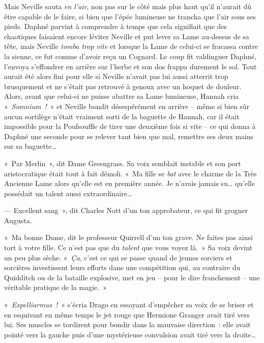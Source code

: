 Mais Neville sauta \emph{en l'air}, non pas sur le côté mais plus haut qu'il n'aurait dû être capable de le faire, si bien que l'épée lumineuse ne trancha que l'air sous ses pieds. Daphné parvint à comprendre à temps que cela signifiait que des chaotiques faisaient encore léviter Neville et put lever sa Lame au-dessus de sa tête, mais Neville \emph{tomba trop vite} et lorsque la Lame de celui-ci se fracassa contre la sienne, ce fut comme d'avoir reçu un Cognard. Le coup fit valdinguer Daphné, l'envoya s'effondrer en arrière sur l'herbe et son dos frappa durement le sol. Tout aurait été alors fini pour elle si Neville n'avait pas lui aussi atterrit trop brusquement et ne s'était pas retrouvé à genoux avec un hoquet de douleur. Alors, avant que celui-ci ne puisse abattre sa Lame lumineuse, Hannah cria «~\emph{Somnium~!}~» et Neville bondit désespérément en arrière -- même si bien sûr aucun sortilège n'était vraiment sorti de la baguette de Hannah, car il était impossible pour la Poufsouffle de tirer une deuxième fois si vite -- ce qui donna à Daphné une seconde pour se relever tant bien que mal, remettre ses deux mains sur sa baguette…

\later

«~Par Merlin~», dit Dame Greengrass. Sa voix semblait instable et son port aristocratique était tout à fait démoli. «~Ma fille se \emph{bat} avec le charme de la Très Ancienne Lame alors qu'elle est en première année. Je n'avais jamais su… qu'elle possédait un talent aussi extraordinaire…

--- Excellent sang~», dit Charles Nott d'un ton approbateur, ce qui fit grogner Augusta.

«~Ma bonne Dame, dit le professeur Quirrell d'un ton grave. Ne faites pas ainsi tort à votre fille. Ce n'est pas que du \emph{talent} que vous voyez là.~» Sa voix devint un peu plus sèche. «~\emph{Ça}, c'est ce qui se passe quand de jeunes sorciers et sorcières investissent leurs efforts dans une compétition qui, au contraire du Quidditch ou de la bataille explosive, met en jeu -- pour le dire franchement -- une véritable pratique de la magie.~»

\later

«~\emph{Expelliarmus~!}~» s'écria Drago en essayant d'empêcher sa voix de se briser et en esquivant en même temps le jet rouge que Hermione Granger avait tiré vers lui. Ses muscles se tordirent pour bondir dans la mauvaise direction~: elle avait pointé vers la gauche puis d'une mystérieuse convulsion avait tiré vers la droite…

